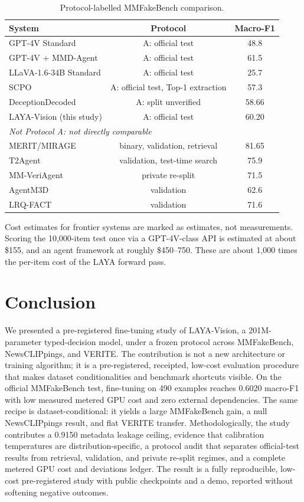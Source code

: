 \documentclass{article} %
\begin{document}
\begin{table}[t]
\centering
\small
\caption{Protocol-labelled MMFakeBench comparison.}
\label{tab:protocol}
\begin{tabular}{lcc}
\toprule
System & Protocol & Macro-F1 \\
\midrule
GPT-4V Standard & A: official test & 48.8 \\
GPT-4V + MMD-Agent & A: official test & 61.5 \\
LLaVA-1.6-34B Standard & A: official test & 25.7 \\
SCPO & A: official test, Top-1 extraction & 57.3 \\
DeceptionDecoded & A: split unverified & 58.66 \\
LAYA-Vision (this study) & A: official test & 60.20 \\
\midrule
\multicolumn{3}{l}{\textit{Not Protocol A: not directly comparable}} \\
MERIT/MIRAGE & binary, validation, retrieval & 81.65 \\
T2Agent & validation, test-time search & 75.9 \\
MM-VeriAgent & private re-split & 71.5 \\
AgentM3D & validation & 62.6 \\
LRQ-FACT & validation & 71.6 \\
\bottomrule
\end{tabular}
\end{table}

Cost estimates for frontier systems are marked as estimates, not measurements. Scoring the 10,000-item test once via a GPT-4V-class API is estimated at about \$155, and an agent framework at roughly \$450--750. These are about 1,000 times the per-item cost of the LAYA forward pass.

\section{Conclusion}
\label{sec:conclusion}
We presented a pre-registered fine-tuning study of LAYA-Vision, a 201M-parameter typed-decision model, under a frozen protocol across MMFakeBench, NewsCLIPpings, and VERITE. The contribution is not a new architecture or training algorithm; it is a pre-registered, receipted, low-cost evaluation procedure that makes dataset conditionalities and benchmark shortcuts visible. On the official MMFakeBench test, fine-tuning on 490 examples reaches 0.6020 macro-F1 with low measured metered GPU cost and zero external dependencies. The same recipe is dataset-conditional: it yields a large MMFakeBench gain, a null NewsCLIPpings result, and flat VERITE transfer. Methodologically, the study contributes a 0.9150 metadata leakage ceiling, evidence that calibration temperatures are distribution-specific, a protocol audit that separates official-test results from retrieval, validation, and private re-split regimes, and a complete metered GPU cost and deviations ledger. The result is a fully reproducible, low-cost pre-registered study with public checkpoints and a demo, reported without softening negative outcomes.
\end{document}
